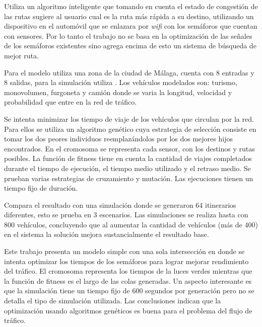 \begin{itemize}
\begin{item}
		Utiliza un algoritmo inteligente que tomando en cuenta el estado de congestión de las rutas sugiere al usuario cual es la ruta más rápida a su destino, utilizando un dispositivo en el automóvil que se enlazara por \emph{wifi} con los semáforos que cuentan con sensores. Por lo tanto el trabajo no se basa en la optimización de las señales de los semáforos existentes sino agrega encima de esto un sistema de búsqueda de mejor ruta.
		
		Para el modelo utiliza una zona  de la ciudad de Málaga, cuenta con 8 entradas y 8 salidas, para la simulación utiliza \citet{SUMO}. Los vehículos modelados son: turismo, monovolumen, furgoneta y camión donde se varia la longitud, velocidad y probabilidad que entre en la red de tráfico.
		
		Se intenta minimizar los tiempo de viaje de los vehículos que circulan por la red. Para ellos se utiliza un algoritmo genético cuya estrategia de selección consiste en tomar los dos peores individuos reemplazándolos por los dos mejores hijos encontrados. En el cromosoma se representa cada sensor, con los destinos y rutas posibles. La función de fitness tiene en cuenta la cantidad de viajes completados durante el tiempo de ejecución, el tiempo medio utilizado y el retraso medio. Se prueban varias estrategias de cruzamiento y mutación. Las ejecuciones tienen un tiempo fijo de duración.
		
		
		Compara el resultado con una simulación donde se generaron 64 itinerarios diferentes, esto se prueba en 3 escenarios. Las simulaciones se realiza hasta con 800 vehículos, concluyendo que al aumentar la cantidad de vehículos (más de 400) en el sistema la solución mejora sustancialmente el resultado base.
		
	\end{item}	
	
	
	\begin{item}
		Este trabajo presenta un modelo simple con una sola intersección en donde se intenta optimizar los tiempos de los semáforos para lograr mejorar rendimiento del tráfico. El cromosoma representa los tiempos de la luces verdes mientras que la función de fitness es el largo de las colas generadas. Un aspecto interesante es que la simulación tiene un tiempo fijo de 600 segundos por generación pero no se detalla el tipo de simulación utilizada. Las conclusiones indican que la optimización usando algoritmos genéticos  es buena para el problema del flujo de tráfico.	
	\end{item}	
	

\end{itemize}
